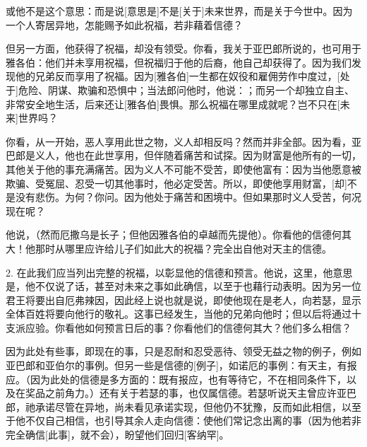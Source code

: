 或他不是这个意思：而是说[意思是]不是[关于]未来世界，而是关于今世中。因为一个人寄居异地，怎能赐予如此祝福，若非藉着信德？\par

但另一方面，他获得了祝福，却没有领受。你看，我关于亚巴郎所说的，也可用于雅各伯：他们并未享用祝福，但祝福归于他的后裔，他自己却获得了。因为我们发现他的兄弟反而享用了祝福。因为[雅各伯]一生都在奴役和雇佣劳作中度过，[处于]危险、阴谋、欺骗和恐惧中；当法郎问他时，他说：；而另一个却独立自主、非常安全地生活，后来还让[雅各伯]畏惧。那么祝福在哪里成就呢？岂不只在[未来]世界吗？\par

你看，从一开始，恶人享用此世之物，义人却相反吗？然而并非全部。因为看，亚巴郎是义人，他也在此世享用，但伴随着痛苦和试探。因为财富是他所有的一切，其他关于他的事充满痛苦。因为义人不可能不受苦，即使他富有：因为当他愿意被欺骗、受冤屈、忍受一切其他事时，他必定受苦。所以，即使他享用财富，[却]不是没有悲伤。为何？你问。因为他处于痛苦和困境中。但如果那时义人受苦，何况现在呢？\par

他说，（然而厄撒乌是长子；但他因雅各伯的卓越而先提他）。你看他的信德何其大！他那时从哪里应许给儿子们如此大的祝福？完全出自他对天主的信德。\par

2. 在此我们应当列出完整的祝福，以彰显他的信德和预言。他说，这里，他意思是，他不仅说了话，甚至对未来之事如此确信，以至于也藉行动表明。因为另一位君王将要出自厄弗辣因，因此经上说也就是说，即使他现在是老人，向若瑟，显示全体百姓将要向他行的敬礼。这事已经发生，当他的兄弟向他时；但以后将通过十支派应验。你看他如何预言日后的事？你看他们的信德何其大？他们多么相信？\par

因为此处有些事，即现在的事，只是忍耐和忍受恶待、领受无益之物的例子，例如亚巴郎和亚伯尔的事例。但另一些是信德的[例子]，如诺厄的事例：有天主，有报应。（因为此处的信德是多方面的：既有报应，也有等待它，不在相同条件下，以及在奖品之前角力。）还有关于若瑟的事，也仅属信德。若瑟听说天主曾应许亚巴郎，祂承诺尽管在异地，尚未看见承诺实现，但他仍不犹豫，反而如此相信，以至于他不仅自己相信，也引导其余人走向信德：使他们常记念出离的事（因为他若非完全确信[此事]，就不会），盼望他们回归[客纳罕]。\par

